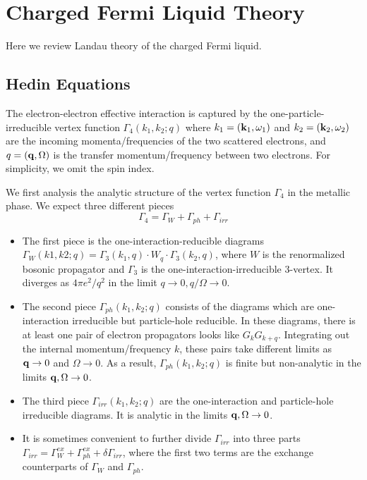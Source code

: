 \documentclass[reprint,amsmath,amssymb,aps,prb]{revtex4-1}
\begin{document}
\appendix
\section{Charged Fermi Liquid Theory}
\label{appendix:FL}

Here we review Landau theory of the charged Fermi liquid.

\subsection{Hedin Equations}

The electron-electron effective interaction is captured by the one-particle-irreducible vertex function $\Gamma_4(k_1, k_2; q)$ where $k_1=(\mathbf{k}_1, \omega_1)$ and $k_2=(\mathbf{k}_2, \omega_2)$ are the incoming momenta/frequencies of the two scattered electrons, and $q=(\mathbf{q}, \Omega)$ is the transfer momentum/frequency between two electrons. For simplicity, we omit the spin index.

We first analysis the analytic structure of the vertex function $\Gamma_4$ in the metallic phase. We expect three different pieces
\begin{equation}
    \Gamma_4=\Gamma_W+\Gamma_{ph}+\Gamma_{irr}
\end{equation}

\begin{itemize}
    \item The first piece is the one-interaction-reducible diagrams $\Gamma_W (k1, k2; q)=\Gamma_3(k_1, q) \cdot W_q \cdot \Gamma_3(k_2, q)$, where $W$ is the renormalized bosonic propagator and $\Gamma_3$ is the one-interaction-irreducible $3$-vertex. It diverges as $4\pi e^2/q^2$ in the limit $q\rightarrow 0, q/\Omega \rightarrow 0$.
    \item The second piece $\Gamma_{ph}(k_1, k_2; q)$ consists of the diagrams which are one-interaction irreducible but particle-hole reducible. In these diagrams, there is at least one pair of electron propagators looks like $G_k G_{k+q}$. Integrating out the internal momentum/frequency $k$, these pairs take different limits as $\mathbf{q}\rightarrow 0$ and $\Omega \rightarrow 0$. As a result, $\Gamma_{ph}(k_1, k_2; q)$ is finite but non-analytic in the limits $\mathbf{q}, \Omega \rightarrow 0$.

    \item The third piece $\Gamma_{irr}(k_1, k_2; q)$ are the one-interaction and particle-hole irreducible diagrams. It is analytic in the limits $\mathbf{q}, \Omega \rightarrow 0$.

    \item It is sometimes convenient to further divide $\Gamma_{irr}$ into three parts $\Gamma_{irr}=\Gamma_W^{ex}+\Gamma_{ph}^{ex}+\delta \Gamma_{irr}$, where the first two terms are the exchange counterparts of $\Gamma_W$ and $\Gamma_{ph}$.
\end{itemize}
\end{document}
